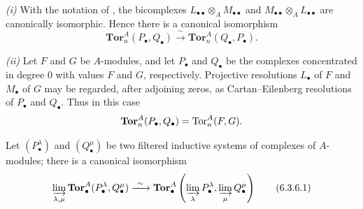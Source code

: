 \begin{remarks}[6.3.5]
\label{III.6.3.5}
\emph{(i)} With the notation of , the bicomplexes
$L_{\bullet\bullet}\otimes_AM_{\bullet\bullet}$ and
$M_{\bullet\bullet}\otimes_AL_{\bullet\bullet}$ are canonically
isomorphic.  Hence there is a canonical isomorphism
\[
  \mathbf{Tor}_n^A(P_\bullet,Q_\bullet)
  \xrightarrow{\ \sim\ }
  \mathbf{Tor}_n^A(Q_\bullet,P_\bullet).
\]

\emph{(ii)} Let $F$ and $G$ be $A$-modules, and let $P_\bullet$
and $Q_\bullet$ be the complexes concentrated in degree $0$ with
values $F$ and $G$, respectively.  Projective resolutions
$L_\bullet$ of $F$ and $M_\bullet$ of $G$ may be regarded, after
adjoining zeros, as Cartan--Eilenberg resolutions of $P_\bullet$
and $Q_\bullet$.  Thus in this case
\[
  \mathbf{Tor}_n^A(P_\bullet,Q_\bullet)=\operatorname{Tor}_n^A(F,G).
\]
\end{remarks}

\begin{proposition}[6.3.6]
\label{III.6.3.6}
Let $(P_\bullet^\lambda)$ and $(Q_\bullet^\mu)$ be two filtered
inductive systems of complexes of $A$-modules; there is a
canonical isomorphism
\[
  \varinjlim_{\lambda,\mu}
  \mathbf{Tor}_\bullet^A(P_\bullet^\lambda,Q_\bullet^\mu)
  \xrightarrow{\ \sim\ }
  \mathbf{Tor}_\bullet^A\left(
    \varinjlim_\lambda P_\bullet^\lambda,
    \varinjlim_\mu Q_\bullet^\mu
  \right)
  \tag{6.3.6.1}\label{III.6.3.6.1}
\]
\end{proposition}

